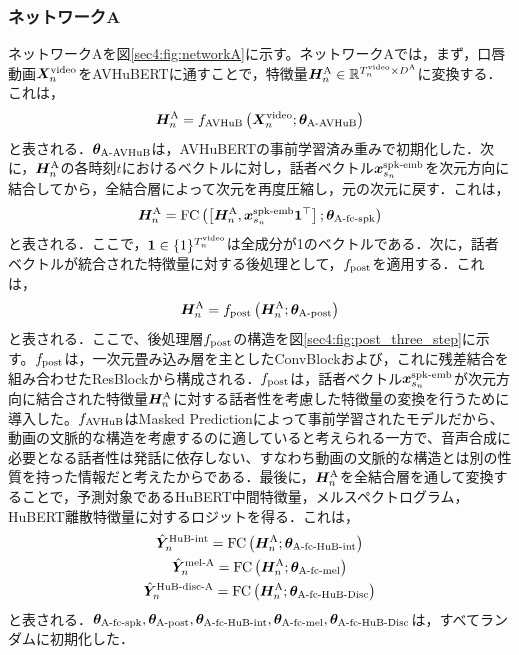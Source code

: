 \subsubsection{ネットワークA}
ネットワークAを図\ref{sec4:fig:networkA}に示す。ネットワークAでは，まず，口唇動画$\bm{X}^{\text{video}}_{n}$をAVHuBERTに通すことで，特徴量$\bm{H}^{\text{A}}_{n} \in \mathbb{R}^{T^{\text{video}}_{n} \times D^{\text{A}}}$に変換する．これは，
\begin{equation}
    \bm{H}^{\text{A}}_{n} = f_{\text{AVHuB}}\left(\bm{X}^{\text{video}}_{n}; \bm{\theta}_{\text{A-AVHuB}}\right)
\end{equation}
と表される．$\bm{\theta}_{\text{A-AVHuB}}$は，AVHuBERTの事前学習済み重みで初期化した．次に，$\bm{H}^{\text{A}}_{n}$の各時刻$t$におけるベクトルに対し，話者ベクトル$\bm{x}^{\text{spk-emb}}_{s_{n}}$を次元方向に結合してから，全結合層によって次元を再度圧縮し，元の次元に戻す．これは，
\begin{equation}
    \bm{H}^{\text{A}}_{n} = \text{FC}\left(\left[\bm{H}^{\text{A}}_{n}, \bm{x}^{\text{spk-emb}}_{s_{n}} \bm{1}^{\top}\right]; \bm{\theta}_{\text{A-fc-spk}}\right)
\end{equation}
と表される．ここで，$\bm{1} \in \{1\}^{T^{\text{video}}_{n}}$は全成分が1のベクトルである．次に，話者ベクトルが統合された特徴量に対する後処理として，$f_{\text{post}}$を適用する．これは，
\begin{equation}
    \bm{H}^{\text{A}}_{n} = f_{\text{post}}\left(\bm{H}^{\text{A}}_{n}; \bm{\theta}_{\text{A-post}}\right)
\end{equation}
と表される．ここで、後処理層$f_{\text{post}}$の構造を図\ref{sec4:fig:post_three_step}に示す。$f_{\text{post}}$は，一次元畳み込み層を主としたConvBlockおよび，これに残差結合を組み合わせたResBlockから構成される．$f_{\text{post}}$は，話者ベクトル$\bm{x}^{\text{spk-emb}}_{s_{n}}$が次元方向に結合された特徴量$\bm{H}^{\text{A}}_{n}$に対する話者性を考慮した特徴量の変換を行うために導入した。$f_{\text{AVHuB}}$はMasked Predictionによって事前学習されたモデルだから、動画の文脈的な構造を考慮するのに適していると考えられる一方で、音声合成に必要となる話者性は発話に依存しない、すなわち動画の文脈的な構造とは別の性質を持った情報だと考えたからである．最後に，$\bm{H}^{\text{A}}_{n}$を全結合層を通して変換することで，予測対象であるHuBERT中間特徴量，メルスペクトログラム，HuBERT離散特徴量に対するロジットを得る．これは，
\begin{gather}
    \hat{\bm{Y}}^{\text{HuB-int}}_{n} = \text{FC}\left(\bm{H}^{\text{A}}_{n}; \bm{\theta}_{\text{A-fc-HuB-int}}\right) \\
    \hat{\bm{Y}}^{\text{mel-A}}_{n} = \text{FC}\left(\bm{H}^{\text{A}}_{n}; \bm{\theta}_{\text{A-fc-mel}}\right) \\
    \hat{\bm{Y}}^{\text{HuB-disc-A}}_{n} = \text{FC}\left(\bm{H}^{\text{A}}_{n}; \bm{\theta}_{\text{A-fc-HuB-Disc}}\right)
\end{gather}
と表される．$\bm{\theta}_{\text{A-fc-spk}}, \bm{\theta}_{\text{A-post}}, \bm{\theta}_{\text{A-fc-HuB-int}}, \bm{\theta}_{\text{A-fc-mel}}, \bm{\theta}_{\text{A-fc-HuB-Disc}}$は，すべてランダムに初期化した．

